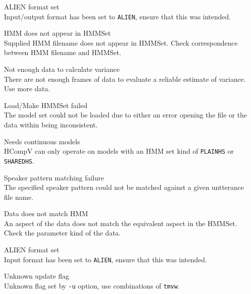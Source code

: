\begin{itemize}
\begin{itemize}
\end{itemize}


\begin{itemize}
    ALIEN format set\\
        Input/output format has been set to \texttt{ALIEN}, ensure that 
        this was intended.

\end{itemize}


\begin{itemize}
    HMM does not appear in HMMSet\\
        Supplied HMM filename does not appear in HMMSet. Check
        correspondence between HMM filename and HMMSet.

    Not enough data to calculate variance\\
        There are not enough frames of data to evaluate a
        reliable estimate of variance. Use more data.

    Load/Make HMMSet failed\\
        The model set could not be loaded due to either an error opening the
        file or the data within being inconsistent.

    Needs continuous models\\
        HCompV can only operate on models with an HMM set kind
        of \texttt{PLAINHS} or \texttt{SHAREDHS}.

    Speaker pattern matching failure\\
        The specified speaker pattern could not be matched against a
        given untterance file name.

    Data does not match HMM\\
        An aspect of the data does not match the equivalent aspect in 
        the HMMSet.  Check the parameter kind of the data.

    ALIEN format set\\
        Input format has been set to \texttt{ALIEN}, ensure that this was 
        intended.

\end{itemize}


\begin{itemize}
    Unknown update flag\\
        Unknown flag set by \texttt{-u} option, use combinations of 
        \texttt{tmvw}.


\end{itemize}
\end{itemize}
